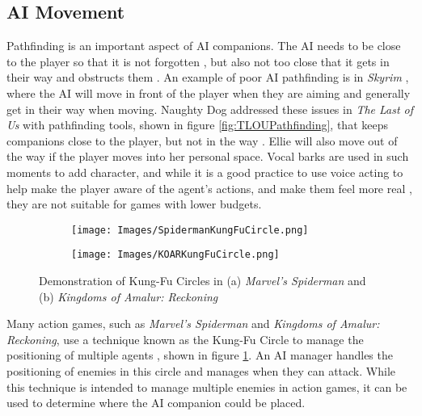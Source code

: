 \documentclass{IEEEtran}
\begin{document}
\subsection{AI Movement}
\label{Movement}


Pathfinding is an important aspect of AI companions. The AI needs to be close to the player so that it is not forgotten \cite{GAIP2EllieAI}, but also not too close that it gets in their way and obstructs them \cite{CoupledEmpowermentMaximisation}. An example of poor AI pathfinding is in \textit{Skyrim} \cite{tremblay2013adaptive}, where the AI will move in front of the player when they are aiming and generally get in their way when moving. Naughty Dog addressed these issues in \textit{The Last of Us} with pathfinding tools, shown in figure \ref{fig:TLOUPathfinding}, that keeps companions close to the player, but not in the way \cite{GAIP2EllieAI}. Ellie will also move out of the way if the player moves into her personal space. Vocal barks are used in such moments to add character, and while it is a good practice to use voice acting to help make the player aware of the agent’s actions, and make them feel more real \cite{GMTGoodAI}, they are not suitable for games with lower budgets.

\begin{figure}
  \centering
  
  \begin{subfigure}[a]{\linewidth}
  \texttt{[image: Images/SpidermanKungFuCircle.png]}
  \end{subfigure}
  
  \begin{subfigure}[b]{\linewidth}
  \texttt{[image: Images/KOARKungFuCircle.png]}
  \end{subfigure}
  
  \caption{Demonstration of Kung-Fu Circles in (a) \textit{Marvel's Spiderman} and (b) \textit{Kingdoms of Amalur: Reckoning}}
  \label{fig:KungFuCircle}
\end{figure}

Many action games, such as \textit{Marvel's Spiderman} and \textit{Kingdoms of Amalur: Reckoning}, use a technique known as the Kung-Fu Circle to manage the positioning of multiple agents \cite{GAIPKungFuCircle, GDCSpiderman}, shown in figure \ref{fig:KungFuCircle}. An AI manager handles the positioning of enemies in this circle and manages when they can attack. While this technique is intended to manage multiple enemies in action games, it can be used to determine where the AI companion could be placed.
\end{document}

